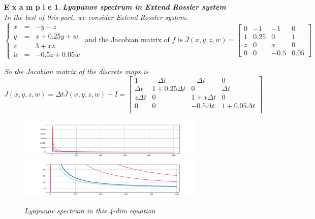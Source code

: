 \documentclass[12pt]{article}
\theoremstyle{plain}
\newtheorem{example}{\textbf{E x a m p l e}}[section]
\begin{document}
\begin{example}\textbf{Lyapunov spectrum in Extend Rossler system}
\\\noindent In the last of this part, we consider Extend Rossler system:
$$
\left\{\begin{array}{lll}
\dot x & = & -y-z \\
\dot y & = & x+0.25y+w \\
\dot z & = & 3+xz\\
\dot w & = & -0.5 z + 0.05w
\end{array}\right. \text{ and the Jacobian matrix of $f$ is } \bar J(x, y, z, w) = \left[\begin{array}{llll}
0   & -1    & -1    & 0     \\
1   & 0.25  & 0     & 1     \\
z   & 0     & x     & 0     \\
0   & 0     & -0.5  & 0.05
\end{array}\right]
$$

So the Jacobian matrix of the discrete maps is 
$$
J(x, y, z, w) = \Delta t\bar J(x, y, z, w) + I = \left[\begin{array}{llll}
1           & -\Delta t         & -\Delta t     & 0             \\
\Delta t    & 1 + 0.25\Delta t  & 0             & \Delta t      \\
z\Delta t   & 0                 & 1 + x\Delta t & 0             \\
0           & 0                 & -0.5 \Delta t & 1+0.05\Delta t\\
\end{array}\right]
$$
\begin{figure}[H]
\begin{center}
\includegraphics[width=0.8\textwidth]{figure/section5/Lya-spe-4-dim-full.png} \\
\includegraphics[width=0.8\textwidth]{figure/section5/Lya-spe-4-dim-partical.png} \\
\caption{Lyapunov spectrum in this 4-dim equation}
\end{center}
\end{figure}
\end{example}
\end{document}
